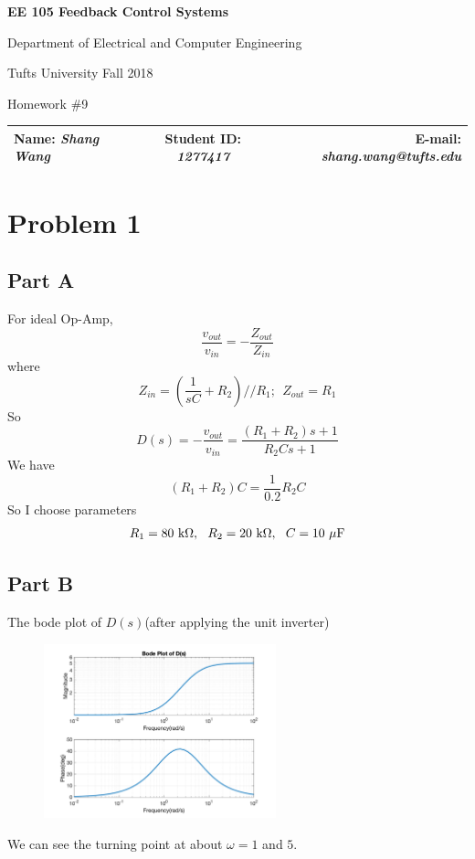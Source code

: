 \documentclass[a4paper]{article}
\begin{document}
\begin{center}
\bf\Large
EE 105 Feedback Control Systems\par
Department of Electrical and Computer Engineering\par
Tufts University Fall 2018\par
Homework \#9\par   
\end{center}
\begin{table}[H]
\begin{center}
\begin{tabular*}{\textwidth}{@{\extracolsep{\fill}}lcr}
Name: {\it Shang Wang} &Student ID: {\it 1277417} &E-mail: {\it shang.wang@tufts.edu}\\
\hline
\end{tabular*}
\end{center}
\end{table}




\section{Problem 1}
\subsection{Part A}
For ideal Op-Amp, 
$$
\frac{v_{out}}{v_{in}} = -\frac {Z_{out}}{Z_{in}}
$$
where
$$
Z_{in} = (\frac{1}{sC}+R_2)//R_1;\ \ Z_{out} = R_1
$$
So 
$$
D(s)  = - \frac{v_{out}}{v_{in}} = \frac{(R_1+R_2)s + 1}{ R_2C s + 1 }
$$
We have
$$
(R_1+R_2)C = \frac {1}{0.2}R_2C
$$
So I choose parameters
$$
R_1 = 80\ {\rm k\Omega }, \ \ R_2 = 20\ {\rm k\Omega }, \ \ C = 10\ {\rm \mu F}
$$
\subsection{Part B}
The bode plot of $D(s)$(after applying the unit inverter)
\begin{figure}[H]
\centering
\includegraphics[width = 0.6\textwidth]{pic/0.png}
\end{figure}
\noindent We can see the turning point at about $\omega = 1$ and $5$. 
\end{document}
